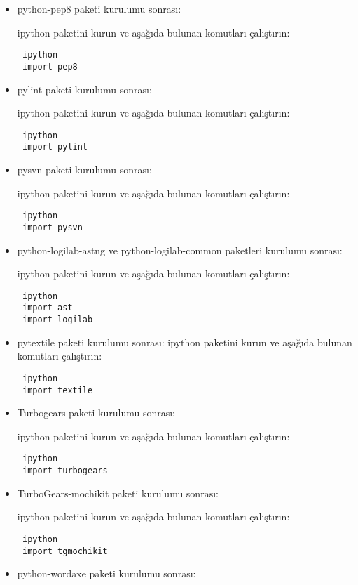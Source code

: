 \documentclass[a4paper,10pt]{article}
\begin{document}
\begin{itemize}
\item python-pep8  paketi kurulumu sonrası:

ipython paketini kurun ve aşağıda bulunan komutları çalıştırın:
\begin{verbatim}
 ipython
 import pep8
\end{verbatim}

\item pylint  paketi kurulumu sonrası:

ipython paketini kurun ve aşağıda bulunan komutları çalıştırın:
\begin{verbatim}
 ipython
 import pylint
\end{verbatim}

\item pysvn  paketi kurulumu sonrası:

ipython paketini kurun ve aşağıda bulunan komutları çalıştırın:
\begin{verbatim}
 ipython
 import pysvn
\end{verbatim}

\item python-logilab-astng ve python-logilab-common  paketleri kurulumu sonrası:

ipython paketini kurun ve aşağıda bulunan komutları çalıştırın:
\begin{verbatim}
 ipython
 import ast
 import logilab
\end{verbatim}


\item pytextile  paketi kurulumu sonrası:
ipython paketini kurun ve aşağıda bulunan komutları çalıştırın:
\begin{verbatim}
 ipython
 import textile
\end{verbatim}

\item Turbogears  paketi kurulumu sonrası:

ipython paketini kurun ve aşağıda bulunan komutları çalıştırın:
\begin{verbatim}
 ipython
 import turbogears
\end{verbatim}

\item TurboGears-mochikit  paketi kurulumu sonrası:

ipython paketini kurun ve aşağıda bulunan komutları çalıştırın:
\begin{verbatim}
 ipython
 import tgmochikit
\end{verbatim}


\item python-wordaxe paketi kurulumu sonrası:


\end{itemize}
\end{document}

